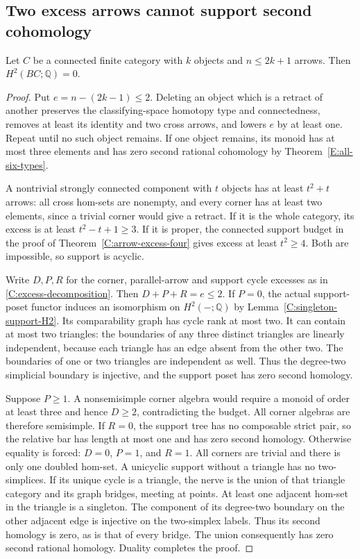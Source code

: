 \subsection{Two excess arrows cannot support second cohomology}

\begin{lemma}\label{C:arrow-excess-two-H2}
Let $C$ be a connected finite category with $k$ objects and
$n\leq2k+1$ arrows.  Then $H^2(BC;\mathbb Q)=0$.
\end{lemma}
\begin{proof}
Put $e=n-(2k-1)\leq2$.  Deleting an object which is a
retract of another preserves the classifying-space
homotopy type and connectedness, removes at least its
identity and two cross arrows, and lowers $e$ by at
least one.  Repeat until no such object remains.
If one object remains, its monoid has at most three
elements and has zero second rational cohomology by
Theorem~\ref{E:all-six-types}.

A nontrivial strongly connected component with $t$
objects has at least $t^2+t$ arrows: all cross hom-sets
are nonempty, and every corner has at least two
elements, since a trivial corner would give a retract.
If it is the whole category, its excess is at least
$t^2-t+1\geq3$.  If it is proper, the connected support
budget in the proof of
Theorem~\ref{C:arrow-excess-four} gives excess at least
$t^2\geq4$.  Both are impossible, so support is acyclic.

Write $D,P,R$ for the corner, parallel-arrow and support
cycle excesses as in
\eqref{C:excess-decomposition}.  Then
$D+P+R=e\leq2$.
If $P=0$, the actual support-poset functor induces an
isomorphism on $H^2(-;\mathbb Q)$ by
Lemma~\ref{C:singleton-support-H2}.  Its comparability
graph has cycle rank at most two.  It can contain at
most two triangles: the boundaries of any three
distinct triangles are linearly independent, because
each triangle has an edge absent from the other two.
The boundaries of one or two triangles are independent
as well.  Thus the degree-two simplicial boundary is
injective, and the support poset has zero second
homology.

Suppose $P\geq1$.  A nonsemisimple corner algebra would
require a monoid of order at least three and hence
$D\geq2$, contradicting the budget.  All corner
algebras are therefore semisimple.  If $R=0$, the
support tree has no composable strict pair, so the
relative bar has length at most one and has zero
second homology.  Otherwise equality is forced:
$D=0$, $P=1$, and $R=1$.  All corners are trivial and
there is only one doubled hom-set.  A unicyclic support
without a triangle has no two-simplices.  If its unique
cycle is a triangle, the nerve is the union of that
triangle category and its graph bridges, meeting at
points.  At least one adjacent hom-set in the triangle
is a singleton.  The component of its degree-two
boundary on the other adjacent edge is injective on
the two-simplex labels.  Thus its second homology is
zero, as is that of every bridge.  The union consequently
has zero second rational homology.
Duality completes the proof.
\end{proof}
